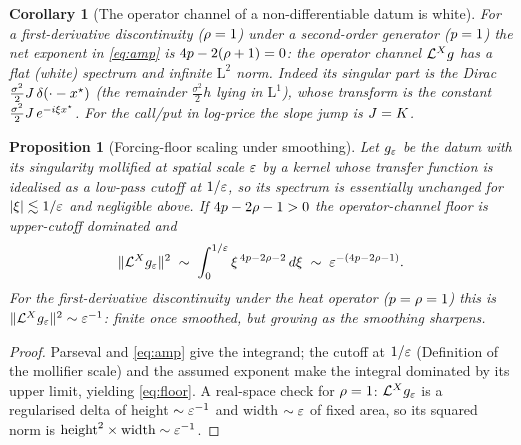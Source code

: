\documentclass[11pt]{article}
\theoremstyle{plain}
\newtheorem{proposition}[theorem]{Proposition}
\newtheorem{corollary}[theorem]{Corollary}
\theoremstyle{definition}
\theoremstyle{remark}
\begin{document}
\begin{corollary}[The operator channel of a non-differentiable datum is white]\label{cor:white}
For a first-derivative discontinuity ($\rho=1$) under a second-order generator
($p=1$) the net exponent in \eqref{eq:amp} is
$4p-2(\rho+1)=0$: the operator channel
$\mathcal{L}^{X}g$ has a flat (white) spectrum and infinite
$\mathrm{L}^{2}$ norm. Indeed its singular part is the Dirac
$\tfrac{\sigma^{2}}{2}J\,\delta(\cdot-x^{\star})$ (the remainder
$\tfrac{\sigma^{2}}{2}h$ lying in $\mathrm{L}^{1}$), whose transform is the constant
$\tfrac{\sigma^{2}}{2}J\,e^{-i\xi x^{\star}}$. For the call/put in
log-price the slope jump is $J=K$.
\end{corollary}

\begin{proposition}[Forcing-floor scaling under smoothing]\label{prop:floor}
Let $g_{\varepsilon}$ be the datum with its singularity mollified at
spatial scale $\varepsilon$ by a kernel whose transfer function is idealised as
a low-pass cutoff at $1/\varepsilon$, so its spectrum is essentially unchanged
for $\lvert\xi\rvert\lesssim1/\varepsilon$ and negligible above. If
$4p-2\rho-1>0$ the operator-channel floor is
upper-cutoff dominated and
\begin{equation}\label{eq:floor}
  \lVert\mathcal{L}^{X}g_{\varepsilon}\rVert^{2}
  \;\sim\;\int_{0}^{1/\varepsilon}\xi^{\,4p-2\rho-2}\,d\xi
  \;\sim\;\varepsilon^{-(4p-2\rho-1)} .
\end{equation}
For the first-derivative discontinuity under the heat operator ($p=\rho=1$)
this is $\lVert\mathcal{L}^{X}g_{\varepsilon}\rVert^{2}\sim\varepsilon^{-1}$:
finite once smoothed, but growing as the smoothing sharpens.
\end{proposition}
\begin{proof}
Parseval and \eqref{eq:amp} give the integrand; the cutoff at $1/\varepsilon$
(Definition of the mollifier scale) and the assumed exponent make the integral
dominated by its upper limit, yielding \eqref{eq:floor}. A real-space check for
$\rho=1$: $\mathcal{L}^{X}g_{\varepsilon}$ is a
regularised delta of height $\sim\varepsilon^{-1}$ and width $\sim\varepsilon$
of fixed area, so its squared norm is
$\text{height}^{2}\times\text{width}\sim\varepsilon^{-1}$.
\end{proof}
\end{document}
